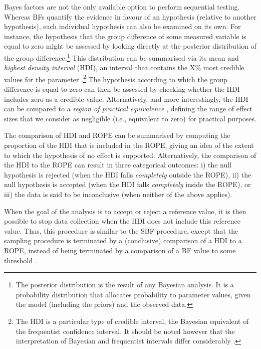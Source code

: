 \documentclass[a4paper,jou,natbib,floatsintext,donotrepeattitle]{apa6}
\begin{document}
Bayes factors are not the only available option to perform sequential testing. Whereas BFs quantify the evidence in favour of an hypothesis (relative to another hypothesis), each individual hypothesis can also be examined on its own. For instance, the hypothesis that the group difference of some measured variable is equal to zero might be assessed by looking directly at the posterior distribution of the group difference.\footnote{The posterior distribution is the result of any Bayesian analysis. It is a probability distribution that allocates probability to parameter values, given the model (including the priors) and the observed data.} This distribution can be summarised via its mean and \textit{highest density interval} (HDI), an interval that contains the X\% most credible values for the parameter \citep{kruschke_bayesian_2018-1}.\footnote{The HDI is a particular type of credible interval, the Bayesian equivalent of the frequentist confidence interval. It should be noted however that the interpretation of Bayesian and frequentist intervals differ considerably \citep[e.g.,][]{morey_fallacy_2016, nalborczyk_pragmatism_2019}.} The hypothesis according to which the group difference is equal to zero can then be assessed by checking whether the HDI includes zero as a credible value. Alternatively, and more interestingly, the HDI can be compared to a \textit{region of practical equivalence} \citep[ROPE,][]{kruschke_rejecting_2018}, defining the range of effect sizes that we consider as negligible (i.e., equivalent to zero) for practical purposes.

The comparison of  HDI and ROPE can be summarised by computing the proportion of the HDI that is included in the ROPE, giving an idea of the extent to which the hypothesis of no effect is supported. Alternatively, the comparison of the HDI to the ROPE can result in three categorical outcomes: i) the null hypothesis is rejected (when the HDI falls \textit{completely} outside the ROPE), ii) the null hypothesis is accepted (when the HDI falls \textit{completely} inside the ROPE), or iii) the data is said to be inconclusive (when neither of the above applies).

When the goal of the analysis is to accept or reject a reference value, it is then possible to stop data collection when the HDI does not include this reference value. Thus, this procedure is similar to the SBF procedure, except that the sampling procedure is terminated by a (conclusive) comparison of a HDI to a ROPE, instead of being terminated by a comparison of a BF value to some threshold \citep[for a detailed study of the characteristics of this procedure, see][]{kruschke_doing_2015}.
\end{document}
